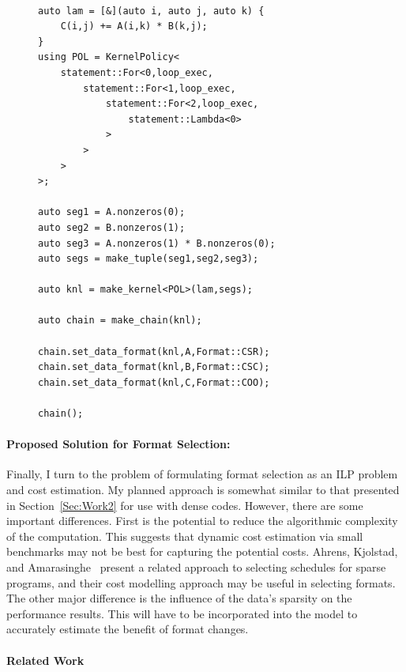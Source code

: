 \documentclass{article}
\begin{document}
\begin{figure}
\begin{lstlisting}[caption={Possible RAJA implementation of Sparse Matrix Multiply.}, label={SparseMMRaja}]
    
auto lam = [&](auto i, auto j, auto k) {
    C(i,j) += A(i,k) * B(k,j);
}
using POL = KernelPolicy<
    statement::For<0,loop_exec,
        statement::For<1,loop_exec,
            statement::For<2,loop_exec,
                statement::Lambda<0>
            >
        >
    >
>;

auto seg1 = A.nonzeros(0);
auto seg2 = B.nonzeros(1);
auto seg3 = A.nonzeros(1) * B.nonzeros(0);
auto segs = make_tuple(seg1,seg2,seg3);

auto knl = make_kernel<POL>(lam,segs);

auto chain = make_chain(knl);

chain.set_data_format(knl,A,Format::CSR);
chain.set_data_format(knl,B,Format::CSC);
chain.set_data_format(knl,C,Format::COO);

chain();

\end{lstlisting}
\end{figure}

\paragraph{Proposed Solution for Format Selection:}
Finally, I turn to the problem of formulating format selection as an ILP problem and cost estimation.
My planned approach is somewhat similar to that presented in Section~\ref{Sec:Work2} for use with dense codes.
However, there are some important differences. 
First is the potential to reduce the algorithmic complexity of the computation. 
This suggests that dynamic cost estimation via small benchmarks may not be best for capturing the potential costs.
Ahrens, Kjolstad, and Amarasinghe~\cite{ahrens2021asymptotic} present a related approach to selecting schedules for sparse programs, and their cost modelling approach may be useful in selecting formats.
The other major difference is the influence of the data's sparsity on the performance results. 
This will have to be incorporated into the model to accurately estimate the benefit of format changes.



\paragraph{Related Work}
\end{document}
